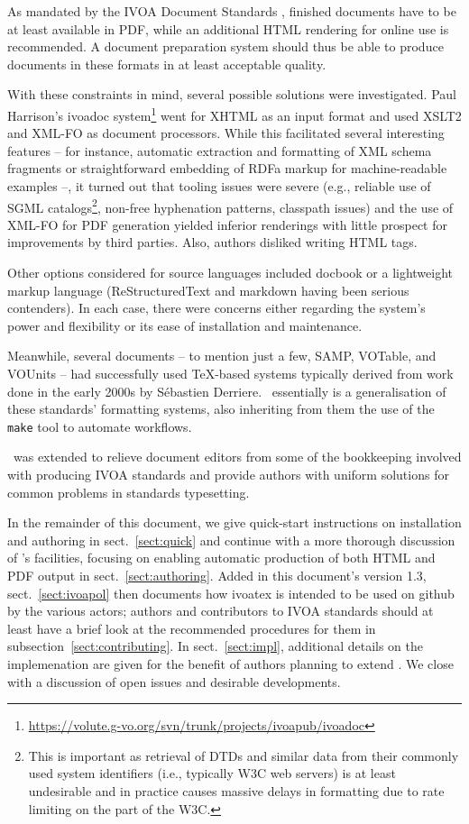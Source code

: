 \documentclass[11pt,a4paper]{ivoa}
\begin{document}
As mandated by the IVOA Document Standards \citep{2017ivoa.spec.0517G},
finished documents have to be at
least available in PDF, while an additional HTML rendering for online
use is recommended.  A document preparation system should thus be
able  to produce documents in these formats in at least acceptable
quality.

With these constraints in mind, several possible solutions were
investigated.  Paul
Harrison's ivoadoc
system\footnote{\url{https://volute.g-vo.org/svn/trunk/projects/ivoapub/ivoadoc}}
went for XHTML as
an input format and used XSLT2 and XML-FO as document processors.  While
this facilitated several interesting features  -- for instance,
automatic extraction and formatting of XML schema fragments or
straightforward embedding of RDFa markup for machine-readable examples
--, it turned out that tooling issues were severe (e.g., reliable use
of SGML catalogs\footnote{This is important as retrieval of DTDs and
similar data from their commonly used system identifiers (i.e.,
typically W3C web servers) is at least undesirable and in practice
causes massive delays in formatting due to rate limiting on the part of
the W3C.}, non-free hyphenation patterns, classpath issues) and the use
of XML-FO for PDF generation yielded inferior renderings with little
prospect for improvements by third parties. Also, authors disliked
writing HTML tags.

Other options considered for source languages included docbook or
a lightweight markup language (ReStructuredText and markdown having
been serious contenders).
In each case, there were concerns either regarding the system's power
and flexibility or its ease of installation and maintenance.

Meanwhile, several documents -- to mention just a few, SAMP, VOTable,
and VOUnits -- had successfully used \TeX-based systems typically
derived from work done in the early 2000s by S\'ebastien Derriere.
\ivoatex\ essentially is a generalisation of these standards' formatting
systems, also inheriting from them the use of the \texttt{make} tool to
automate workflows.

\ivoatex\ was extended to relieve document editors from some of the
bookkeeping involved with producing IVOA standards and provide authors
with uniform solutions for common problems in standards typesetting.

In the remainder of this document, we give quick-start instructions
on installation and authoring in sect.~\ref{sect:quick} and continue
with
a more thorough discussion of \ivoatex's facilities, focusing
on enabling automatic production of both HTML and PDF output in
sect.~\ref{sect:authoring}.  Added in this document's version 1.3,
sect.~\ref{sect:ivoapol} then documents how ivoatex is intended to be
used on github by the various actors; authors and contributors to IVOA
standards should at least have a brief look at the recommended
procedures for them in subsection~\ref{sect:contributing}.
In sect.~\ref{sect:impl}, additional
details on the implemenation are given for the benefit of authors
planning to extend \ivoatex.  We close with a discussion of open issues
and desirable developments.
\end{document}
